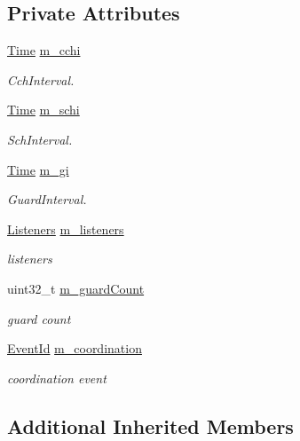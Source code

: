\subsection*{Private Attributes}
\begin{DoxyCompactItemize}
\item 
\hyperlink{classns3_1_1Time}{Time} \hyperlink{classns3_1_1ChannelCoordinator_a75d1781ca3ccc192c2f9bf596f6e1adf}{m\+\_\+cchi}
\begin{DoxyCompactList}\small\item\em Cch\+Interval. \end{DoxyCompactList}\item 
\hyperlink{classns3_1_1Time}{Time} \hyperlink{classns3_1_1ChannelCoordinator_af3cec32294e69ebf22a5dfc92d03ad48}{m\+\_\+schi}
\begin{DoxyCompactList}\small\item\em Sch\+Interval. \end{DoxyCompactList}\item 
\hyperlink{classns3_1_1Time}{Time} \hyperlink{classns3_1_1ChannelCoordinator_a65c0f76d8de9190aa42bddb71f47a624}{m\+\_\+gi}
\begin{DoxyCompactList}\small\item\em Guard\+Interval. \end{DoxyCompactList}\item 
\hyperlink{classns3_1_1ChannelCoordinator_adafd85a4ced25d5fbdf018a826c20ea3}{Listeners} \hyperlink{classns3_1_1ChannelCoordinator_a4a73ebe8043af381efc90394ba538aac}{m\+\_\+listeners}
\begin{DoxyCompactList}\small\item\em listeners \end{DoxyCompactList}\item 
uint32\+\_\+t \hyperlink{classns3_1_1ChannelCoordinator_a7ceaae0946f96cc409c7181ba419d92c}{m\+\_\+guard\+Count}
\begin{DoxyCompactList}\small\item\em guard count \end{DoxyCompactList}\item 
\hyperlink{classns3_1_1EventId}{Event\+Id} \hyperlink{classns3_1_1ChannelCoordinator_aa4df0d5519c0aa65173f0c3276fa44a5}{m\+\_\+coordination}
\begin{DoxyCompactList}\small\item\em coordination event \end{DoxyCompactList}\end{DoxyCompactItemize}
\subsection*{Additional Inherited Members}


